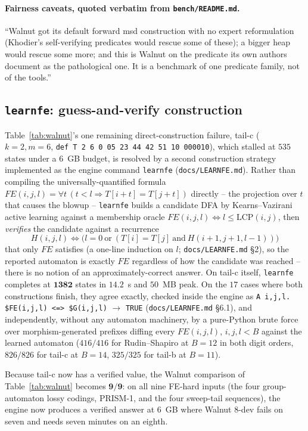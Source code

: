 \documentclass[11pt]{article}
\begin{document}
\paragraph{Fairness caveats, quoted verbatim from \texttt{bench/README.md}.} ``Walnut got
its default forward msd construction with no expert reformulation (Khodier's
self-verifying predicates would rescue some of these); a bigger heap would rescue some
more; and this is Walnut on the predicate its own authors document as the pathological
one. It is a benchmark of one predicate family, not of the tools.''

\subsection{\texttt{learnfe}: guess-and-verify construction}
\label{sec:learnfe}

Table~\ref{tab:walnut}'s one remaining direct-construction failure, tail-c ($k{=}2,m{=}6$,
\texttt{def T 2 6 0 05 23 44 42 51 10 000010}), which stalled at $535$ states under a
$6$~GB budget, is resolved by a second construction strategy implemented as the engine
command \texttt{learnfe} (\texttt{docs/LEARNFE.md}). Rather than compiling the
universally-quantified formula $FE(i,j,l)=\forall t\,(t<l\Rightarrow T[i+t]=T[j+t])$
directly -- the projection over $t$ that causes the blowup -- \texttt{learnfe} builds a
candidate DFA by Kearns--Vazirani active learning against a membership oracle
$FE(i,j,l)\Leftrightarrow l\le\mathrm{LCP}(i,j)$, then \emph{verifies} the candidate
against a recurrence
$$H(i,j,l) \iff \big(l=0 \ \text{or}\ (T[i]{=}T[j]\ \text{and}\ H(i{+}1,j{+}1,l{-}1))\big)$$
that only $FE$ satisfies (a one-line induction on $l$; \texttt{docs/LEARNFE.md} \S2), so
the reported automaton is exactly $FE$ regardless of how the candidate was reached --
there is no notion of an approximately-correct answer. On tail-c itself, \texttt{learnfe}
completes at $\mathbf{1382}$ states in $14.2$~s and $50$~MB peak. On the $17$ cases where
both constructions finish, they agree exactly, checked inside the engine as
\texttt{A i,j,l. \$FE(i,j,l) <=> \$G(i,j,l)} $\to$ \texttt{TRUE}
(\texttt{docs/LEARNFE.md} \S6.1), and independently, without any automaton machinery, by a
pure-Python brute force over morphism-generated prefixes diffing every $FE(i,j,l)$,
$i,j,l<B$ against the learned automaton ($416/416$ for Rudin--Shapiro at $B{=}12$ in both
digit orders, $826/826$ for tail-c at $B{=}14$, $325/325$ for tail-b at $B{=}11$).

Because tail-c now has a verified value, the Walnut comparison of
Table~\ref{tab:walnut} becomes $\mathbf{9/9}$: on all nine FE-hard inputs (the four
group-automaton lossy codings, PRISM-1, and the four sweep-tail sequences), the engine
now produces a verified answer at $6$~GB where Walnut 8-dev fails on seven and needs
seven minutes on an eighth.
\end{document}
